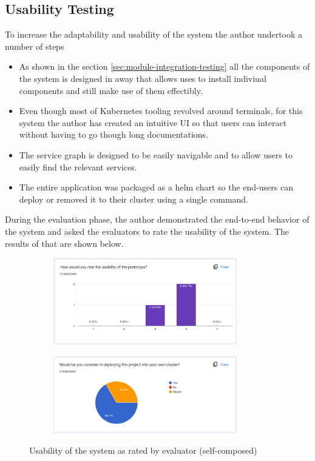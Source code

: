 \subsection{Usability Testing}

To increase the adaptability and usability of the system the author undertook a number of steps

\begin{itemize}
    \item As shown in the section \ref{sec:module-integration-testing} all the components of the system is designed in away that allows uses to install indiviual components and still make use of them effectibly.
    \item Even though most of Kubernetes tooling revolved around terminals, for this system the author has created an intuitive UI so that users can interact without having to go though long documentations.
    \item The service graph is designed to be easily navigable and to allow users to easily find the relevant services.
    \item The entire application was packaged as a helm chart so the end-users can deploy or removed it to their cluster using a single command.

\end{itemize}

\noindent During the evaluation phase, the author demonstrated the end-to-end behavior of the system and asked the evaluators to rate the usability of the system. The results of that are shown below.


\begin{figure}[H]
    \centering
    \begin{subfigure}[bH]{0.49\textwidth}
        \centering
        \includegraphics[width=8cm]{assets/testing/usability.png}
    \end{subfigure}
    \hfill
    \begin{subfigure}[bH]{0.49\textwidth}
        \centering
        \includegraphics[width=8cm]{assets/testing/use-or-not.png}
    \end{subfigure}
    \hfill
    \caption{Usability of the system as rated by evaluator (self-composed)}
\end{figure}




